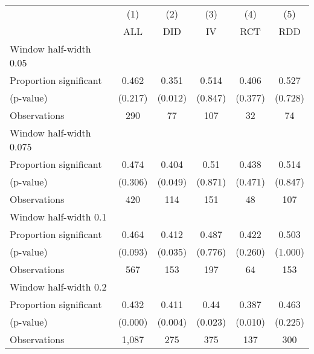 
\def\sym#1{\ifmmode^{#1}\else\(^{#1}\)\fi}
\begin{tabular}{l*{5}{c}}
\hline\hline
& \multicolumn{1}{c}{(1)} &  \multicolumn{1}{c}{(2)} &  \multicolumn{1}{c}{(3)} &  \multicolumn{1}{c}{(4)} &  \multicolumn{1}{c}{(5)}\\
& \multicolumn{1}{c}{ALL} &  \multicolumn{1}{c}{DID} &  \multicolumn{1}{c}{IV} &  \multicolumn{1}{c}{RCT} &  \multicolumn{1}{c}{RDD}\\

\hline
\hline
Window half-width 0.05\\

Proportion significant& 0.462 &  0.351 &  0.514 &  0.406 &  0.527\\

(p-value) & (0.217) &  (0.012) &  (0.847) &  (0.377) &  (0.728)\\

Observations& 290 &  77 &  107 &  32 &  74\\

\hline
Window half-width 0.075\\

Proportion significant& 0.474 &  0.404 &  0.51 &  0.438 &  0.514\\

(p-value) & (0.306) &  (0.049) &  (0.871) &  (0.471) &  (0.847)\\

Observations& 420 &  114 &  151 &  48 &  107\\

\hline
Window half-width 0.1\\

Proportion significant& 0.464 &  0.412 &  0.487 &  0.422 &  0.503\\

(p-value) & (0.093) &  (0.035) &  (0.776) &  (0.260) &  (1.000)\\

Observations& 567 &  153 &  197 &  64 &  153\\

\hline
Window half-width 0.2\\

Proportion significant& 0.432 &  0.411 &  0.44 &  0.387 &  0.463\\

(p-value) & (0.000) &  (0.004) &  (0.023) &  (0.010) &  (0.225)\\

Observations& 1,087 &  275 &  375 &  137 &  300\\


\end{tabular}
